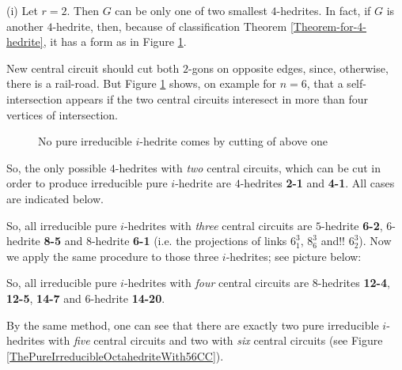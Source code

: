 \documentclass[12pt]{article}
\begin{document}
(i) Let $r=2$. Then $G$ can be only one of two smallest $4$-hedrites. In 
fact, if $G$ is another $4$-hedrite, then, because of classification Theorem 
\ref{Theorem-for-4-hedrite}, it has a form as in Figure \ref{Cutting4hedrite}.

New central circuit should cut both $2$-gons on opposite edges, since, otherwise, there is a rail-road. But Figure \ref{Cutting4hedrite} shows, on example for $n=6$, that a self-intersection appears if the two central circuits interesect in more than four vertices of intersection.


\begin{figure}
\centering
\epsfxsize=40mm
\caption{No pure irreducible $i$-hedrite comes by cutting of above one}
\label{Cutting4hedrite}
\end{figure}



So, the only possible $4$-hedrites with {\em two} central circuits,
which can be cut in order to produce irreducible pure $i$-hedrite
are $4$-hedrites {\bf 2-1} and {\bf 4-1}. All cases are indicated below. 

\begin{center}
\epsfxsize=120mm
\end{center}

So, all irreducible pure $i$-hedrites with {\em three} central circuits are $5$-hedrite {\bf 6-2}, $6$-hedrite {\bf 8-5} and $8$-hedrite {\bf 6-1} (i.e. the projections of links $6^3_1$, $8^3_6$ and!! $6^3_2$).
Now we apply the same procedure to those three $i$-hedrites; see picture below:

\begin{center}
\epsfxsize=120mm
\end{center}

So, all irreducible pure $i$-hedrites with {\em four} central circuits are $8$-hedrites {\bf 12-4}, {\bf 12-5}, {\bf 14-7} and $6$-hedrite {\bf 14-20}.

By the same method, one can see that there are exactly two pure irreducible $i$-hedrites with {\em five} central circuits and two with {\em six} central circuits (see Figure \ref{ThePureIrreducibleOctahedriteWith56CC}).
\end{document}
